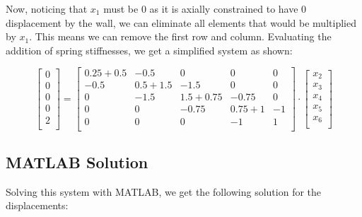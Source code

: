 \documentclass[8pt]{article}
\begin{document}
Now, noticing that \( x_1 \) must be 0 as it is axially constrained to have 0 displacement by the wall, we can eliminate all elements that would be multiplied by \( x_1 \). This means we can remove the first row and column. Evaluating the addition of spring stiffnesses, we get a simplified system as shown:

\[
\begin{bmatrix} 
    0 \\
    0 \\
    0 \\
    0 \\
    2 \\
\end{bmatrix}
=
\begin{bmatrix}
    0.25 + 0.5 & -0.5 & 0 & 0 & 0 \\
    -0.5 & 0.5 + 1.5 & -1.5 & 0 & 0 \\
    0 & -1.5 & 1.5 + 0.75 & -0.75 & 0 \\
    0 & 0 & -0.75 & 0.75 + 1 & -1 \\
    0 & 0 & 0 & -1 & 1 \\
\end{bmatrix}
\cdot
\begin{bmatrix}
    x_2 \\
    x_3 \\
    x_4 \\
    x_5 \\
    x_6 \\
\end{bmatrix}
\]

\subsection{MATLAB Solution}

Solving this system with MATLAB, we get the following solution for the displacements:
\end{document}
